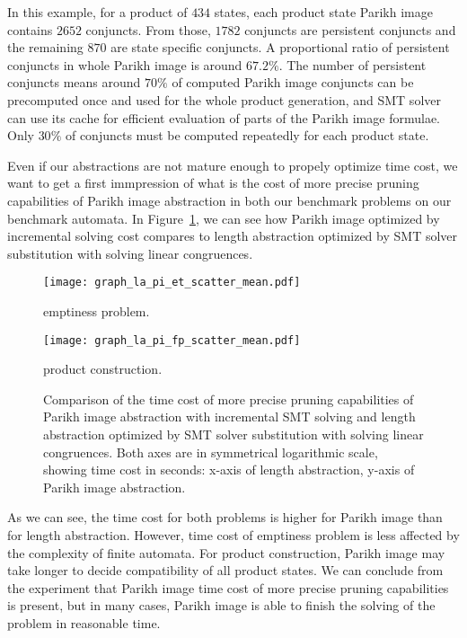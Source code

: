 In this example, for a product of $434$ states, each product state Parikh image contains $2652$ conjuncts. From those, $1782$ conjuncts are persistent conjuncts and the remaining $870$ are state specific conjuncts. A proportional ratio of persistent conjuncts in whole Parikh image is around $67.2 \%$. The number of persistent conjuncts means around $70\%$ of computed Parikh image conjuncts can be precomputed once and used for the whole product generation, and SMT solver can use its cache for efficient evaluation of parts of the Parikh image formulae. Only $30\%$ of conjuncts must be computed repeatedly for each product state.

Even if our abstractions are not mature enough to propely optimize time cost, we want to get a first immpression of what is the cost of more precise pruning capabilities of Parikh image abstraction in both our benchmark problems on our benchmark automata. In Figure~\ref{fig:graph:la_pi_time_cost_comp}, we can see how Parikh image optimized by incremental solving cost compares to length abstraction optimized by SMT solver substitution with solving linear congruences.
\begin{figure}[ht]
    \centering
    \begin{minipage}{0.49\linewidth}
        \centering
        \texttt{[image: graph\_la\_pi\_et\_scatter\_mean.pdf]}
        \caption{emptiness problem.}
        \label{fig:graph:et_pi_la_comp_time_difference}
    \end{minipage}
    \hfill
    \begin{minipage}{0.49\linewidth}
        \centering
        \texttt{[image: graph\_la\_pi\_fp\_scatter\_mean.pdf]}
        \caption{product construction.}
        \label{fig:graph:fp_pi_la_comp_time_difference}
    \end{minipage}
    \vspace{0.5cm}
    \caption{Comparison of the time cost of more precise pruning capabilities of Parikh image abstraction with incremental SMT solving and length abstraction optimized by SMT solver substitution with solving linear congruences. Both axes are in symmetrical logarithmic scale, showing time cost in seconds: x-axis of length abstraction, y-axis of Parikh image abstraction.}
    \label{fig:graph:la_pi_time_cost_comp}
\end{figure}

As we can see, the time cost for both problems is higher for Parikh image than for length abstraction. However, time cost of emptiness problem is less affected by the complexity of finite automata. For product construction, Parikh image may take longer to decide compatibility of all product states. We can conclude from the experiment that Parikh image time cost of more precise pruning capabilities is present, but in many cases, Parikh image is able to finish the solving of the problem in reasonable time.

